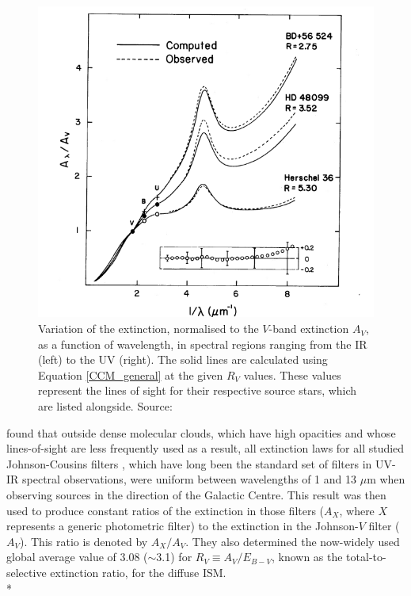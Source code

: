 \documentclass[12pt, a4paper]{report}
\begin{document}
\begin{figure}[h]
\begin{center}
\includegraphics[width=1.0\textwidth]{cardelli_curve_fig4_crop.png}
\caption{Variation of the extinction, normalised to the $V$-band extinction $A_{V}$, as a function of wavelength, in spectral regions ranging from the IR (left) to the UV (right). The solid lines are calculated using Equation \ref{CCM_general} at the given $R_{V}$ values. These values represent the lines of sight for their respective source stars, which are listed alongside.  Source: \cite{1989ApJ...345..245C}}
\label{cardelli_curve}
\end{center}
\end{figure}

\cite{1985ApJ...288..618R} found that outside dense molecular clouds, which have high opacities and whose lines-of-sight are less frequently used as a result, all extinction laws for all studied Johnson-Cousins filters \citep{1953ApJ...117..313J}, which have long been the standard set of filters in UV-IR spectral observations, were uniform between wavelengths of 1 and 13 $\mu$m when observing sources in the direction of the Galactic Centre. This result was then used to produce constant ratios of the extinction in those filters ($A_{X}$, where $X$ represents a generic photometric filter) to the extinction in the Johnson-$V$ filter ($A_{V}$). This ratio is denoted by $A_{X}/A_{V}$. They also determined the now-widely used global average value of 3.08 ($\sim$3.1) for $R_{V} \equiv A_{V}/E_{B-V}$, known as the total-to-selective extinction ratio,  for the diffuse ISM. \\*
\end{document}
